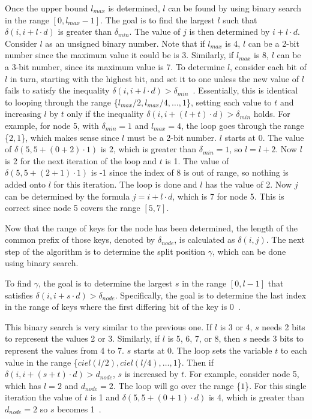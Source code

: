 \documentclass{sig-alternate}
\begin{document}
Once the upper bound $l_{max}$ is determined, $l$ can be found by using binary search in the range $[0,l_{max}-1]$. The goal is to find the largest $l$ such that $\delta(i,i+l \cdot d)$ is greater than $\delta_{min}$. The value of $j$ is then determined by $i+l \cdot d$. Consider $l$ as an unsigned binary number. Note that if $l_{max}$ is 4, $l$ can be a 2-bit number since the maximum value it could be is 3. Similarly, if $l_{max}$ is 8, $l$ can be a 3-bit number, since its maximum value is 7. To determine $l$, consider each bit of $l$ in turn, starting with the highest bit, and set it to one unless the new value of $l$ fails to satisfy the inequality $\delta(i,i+l \cdot d)>\delta_{min}$~\cite{Karras:2012}. Essentially, this is identical to looping through the range \{$l_{max}/2, l_{max}/4,\dots, 1$\}, setting each value to $t$ and increasing $l$ by $t$ only if the inequality $\delta(i,i+(l+t) \cdot d)>\delta_{min}$ holds. For example, for node 5, with $\delta_{min}=1$ and $l_{max}=4$, the loop goes through the range \{$2, 1$\}, which makes sense since $l$ must be a 2-bit number. $l$ starts at 0. The value of $\delta(5, 5+(0+2) \cdot 1)$ is 2, which is greater than $\delta_{min}=1$, so $l=l+2$. Now $l$ is 2 for the next iteration of the loop and $t$ is 1. The value of $\delta(5, 5+(2+1) \cdot 1)$ is -1 since the index of 8 is out of range, so nothing is added onto $l$ for this iteration. The loop is done and $l$ has the value of 2. Now $j$ can be determined by the formula $j=i+l \cdot d$, which is 7 for node 5. This is correct since node 5 covers the range $[5, 7]$.

Now that the range of keys for the node has been determined, the length of the common prefix of those keys, denoted by $\delta_{node}$, is calculated as $\delta(i,j)$. The next step of the algorithm is to determine the split position $\gamma$, which can be done using binary search.

To find $\gamma$, the goal is to determine the largest $s$ in the range $[0, l-1]$ that satisfies $\delta(i, i+s \cdot d) > \delta_{node}$. Specifically, the goal is to determine the last index in the range of keys where the first differing bit of the key is 0~\cite{Karras:2012}.

This binary search is very similar to the previous one. If $l$ is 3 or 4, $s$ needs 2 bits to represent the values 2 or 3. Similarly, if $l$ is 5, 6, 7, or 8, then $s$ needs 3 bits to represent the values from 4 to 7. $s$ starts at 0. The loop sets the variable $t$ to each value in the range \{$ciel(l/2), ciel(l/4), \dots, 1$\}. Then if $\delta(i, i+(s+t) \cdot d)>d_{node}$, $s$ is increased by $t$. For example, consider node 5, which has $l=2$ and $d_{node}=2$. The loop will go over the range \{$1$\}. For this single iteration the value of $t$ is 1 and $\delta(5, 5+(0+1) \cdot d)$ is 4, which is greater than $d_{node}=2$ so $s$ becomes 1~\cite{Karras:2012}.
\end{document}

